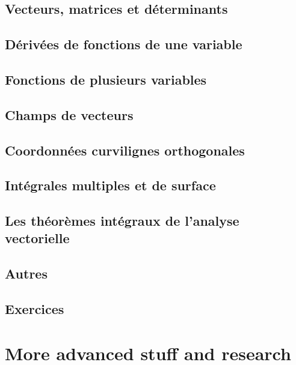 \chapter{Vecteurs, matrices et déterminants}

\chapter{Dérivées de fonctions de une variable}


\chapter{Fonctions de plusieurs variables}


\chapter{Champs de vecteurs}


\chapter{Coordonnées curvilignes orthogonales}


\chapter{Intégrales multiples et de surface}


\chapter{Les théorèmes intégraux de l'analyse vectorielle}


\chapter{Autres}


\chapter{Exercices}


\part{More advanced stuff and research}

